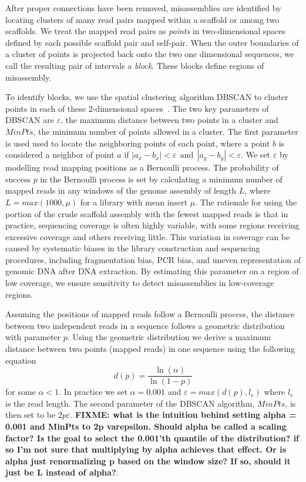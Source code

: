 \documentclass{bioinfo}
\begin{document}
After proper connections have been removed, misassemblies are identified by locating clusters of many read pairs mapped within
a scaffold or among two scaffolds. We treat the mapped read pairs as \emph{points} in
two-dimensional spaces defined by each possible scaffold pair and self-pair. When the outer boundaries of a cluster of points
is projected back onto the two one dimensional sequences, we call the resulting pair of intervals a \emph{block}.
These blocks define regions of misassembly.

To identify blocks, we use the spatial clustering algorithm DBSCAN 
to cluster points in each of these 2-dimensional spaces~\citep{DBSCAN}. The two key parameters of DBSCAN are $\varepsilon$, the maximum distance between 
two points in a cluster and $MinPts$, the minimum number of points allowed in a cluster. The first parameter is used used to locate 
the neighboring points of each point, where a point $b$ is considered a neighbor of point $a$ if $|a_x - b_x| < \varepsilon 
~~\mbox{and}~~ |a_y - b_y| < \varepsilon$. We set $\varepsilon$ by modelling read mapping positions as a Bernoulli process. 
The probability of success $p$ in the Bernoulli process is set by calculating a minimum number of mapped reads
in any windows of the genome assembly of length $L$, where $L = max(1000,\mu)$ for a library with mean insert $\mu$. 
The rationale for using the portion of the crude scaffold assembly with the fewest mapped reads is that in practice, sequencing
coverage is often highly variable, with some regions receiving excessive coverage and others receiving little. This variation
in coverage can be caused by systematic biases in the library construction and sequencing procedures, including fragmentation bias,
PCR bias, and uneven representation of genomic DNA after DNA extraction. By estimating this parameter on a region of low
coverage, we ensure sensitivity to detect misassemblies in low-coverage regions.

Assuming the positions of mapped reads  
follow a Bernoulli process, the distance between two independent reads in a sequence follows a geometric distribution with parameter $p$.
Using the geometric distribution we derive a maximum distance between two points (mapped reads) in one sequence using the following equation
\begin{equation}
	d(p) = \dfrac{\ln(\alpha)}{\ln(1-p)}
\end{equation} 
for some $\alpha < 1$. In practice we set $\alpha = 0.001$ and $\varepsilon = max(d(p),l_r)$ where $l_r$ is the read length.
The second parameter of the DBSCAN algorithm, $MinPts$, is then set to be $2p\varepsilon$.
\textbf{FIXME: what is the intuition behind setting alpha = 0.001 and MinPts to 2p varepsilon. Should alpha be called a scaling factor? Is the goal
to select the 0.001'th quantile of the distribution? if so I'm not sure that multiplying by alpha achieves that effect. Or is alpha just renormalizing p
based on the window size? If so, should it just be L instead of alpha?}.
\end{document}
